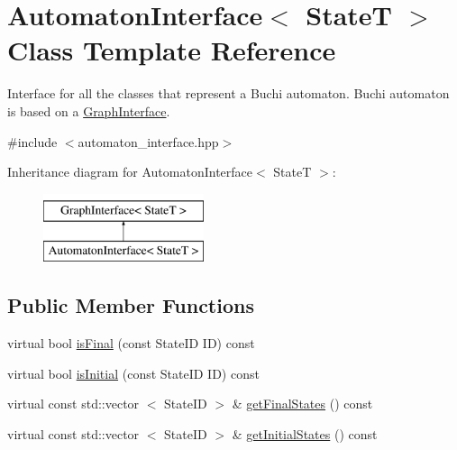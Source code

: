 \hypertarget{classAutomatonInterface}{\section{\-Automaton\-Interface$<$ \-State\-T $>$ \-Class \-Template \-Reference}
\label{classAutomatonInterface}
}


\-Interface for all the classes that represent a \-Buchi automaton. \-Buchi automaton is based on a \hyperlink{classGraphInterface}{\-Graph\-Interface}.  




{\ttfamily \#include $<$automaton\-\_\-interface.\-hpp$>$}

\-Inheritance diagram for \-Automaton\-Interface$<$ \-State\-T $>$\-:\begin{figure}[H]
\begin{center}
\leavevmode
\includegraphics[height=2.000000cm]{classAutomatonInterface}
\end{center}
\end{figure}
\subsection*{\-Public \-Member \-Functions}
\begin{DoxyCompactItemize}
\item 
virtual bool \hyperlink{classAutomatonInterface_a69bfa177f6d048789c828260ff354e42}{is\-Final} (const \-State\-I\-D \-I\-D) const 
\item 
virtual bool \hyperlink{classAutomatonInterface_a97fee6da4d6d64d8ab8afdb57748c6b4}{is\-Initial} (const \-State\-I\-D \-I\-D) const 
\item 
virtual const std\-::vector\*
$<$ \-State\-I\-D $>$ \& \hyperlink{classAutomatonInterface_ad91771a569bbd8fe78b324d3eb28b9f6}{get\-Final\-States} () const 
\item 
virtual const std\-::vector\*
$<$ \-State\-I\-D $>$ \& \hyperlink{classAutomatonInterface_a2674e9b97aa1dd2d975eed682813c8cf}{get\-Initial\-States} () const 
\end{DoxyCompactItemize}
